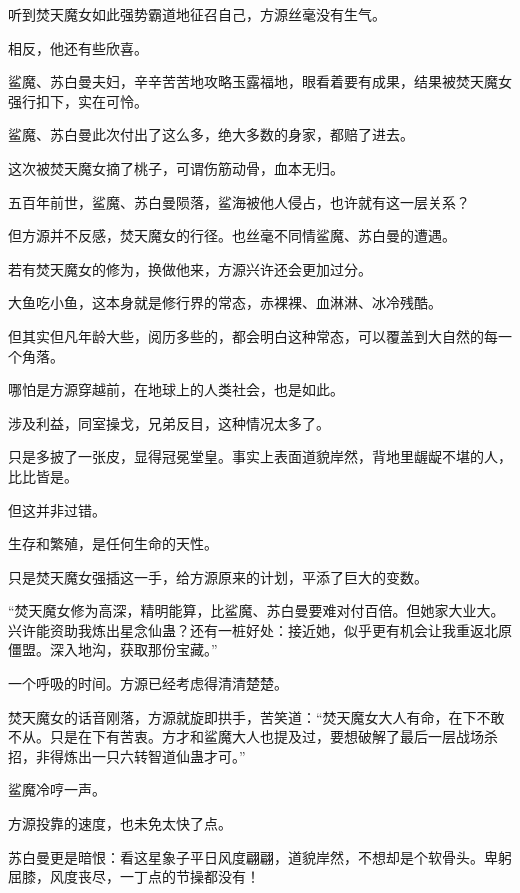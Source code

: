 
\begin{this_body}



听到焚天魔女如此强势霸道地征召自己，方源丝毫没有生气。

相反，他还有些欣喜。

鲨魔、苏白曼夫妇，辛辛苦苦地攻略玉露福地，眼看着要有成果，结果被焚天魔女强行扣下，实在可怜。

鲨魔、苏白曼此次付出了这么多，绝大多数的身家，都赔了进去。

这次被焚天魔女摘了桃子，可谓伤筋动骨，血本无归。

五百年前世，鲨魔、苏白曼陨落，鲨海被他人侵占，也许就有这一层关系？

但方源并不反感，焚天魔女的行径。也丝毫不同情鲨魔、苏白曼的遭遇。

若有焚天魔女的修为，换做他来，方源兴许还会更加过分。

大鱼吃小鱼，这本身就是修行界的常态，赤裸裸、血淋淋、冰冷残酷。

但其实但凡年龄大些，阅历多些的，都会明白这种常态，可以覆盖到大自然的每一个角落。

哪怕是方源穿越前，在地球上的人类社会，也是如此。

涉及利益，同室操戈，兄弟反目，这种情况太多了。

只是多披了一张皮，显得冠冕堂皇。事实上表面道貌岸然，背地里龌龊不堪的人，比比皆是。

但这并非过错。

生存和繁殖，是任何生命的天性。

只是焚天魔女强插这一手，给方源原来的计划，平添了巨大的变数。

“焚天魔女修为高深，精明能算，比鲨魔、苏白曼要难对付百倍。但她家大业大。兴许能资助我炼出星念仙蛊？还有一桩好处：接近她，似乎更有机会让我重返北原僵盟。深入地沟，获取那份宝藏。”

一个呼吸的时间。方源已经考虑得清清楚楚。

焚天魔女的话音刚落，方源就旋即拱手，苦笑道：“焚天魔女大人有命，在下不敢不从。只是在下有苦衷。方才和鲨魔大人也提及过，要想破解了最后一层战场杀招，非得炼出一只六转智道仙蛊才可。”

鲨魔冷哼一声。

方源投靠的速度，也未免太快了点。

苏白曼更是暗恨：看这星象子平日风度翩翩，道貌岸然，不想却是个软骨头。卑躬屈膝，风度丧尽，一丁点的节操都没有！


\end{this_body}
